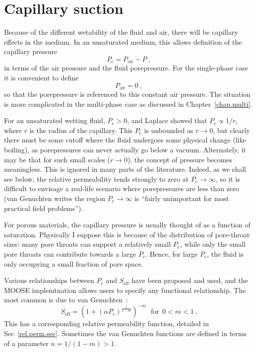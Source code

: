 \documentclass[]{scrreprt}
\begin{document}
\section{Capillary suction}

Because of the different wetability of the fluid and air, there will
be capillary effects in the medium.  In an unsaturated medium, this
allows definition of the capillary pressure
\begin{equation}
P_{\mathrm{c}} = P_{\mathrm{air}} - P \ ,
\end{equation}
in terms of the air pressure and the fluid porepressure.  For the
single-phase case it is convenient to define
\begin{equation}
P_{\mathrm{air}} = 0 \ ,
\label{eqn.pair.zero}
\end{equation}
so that the porepressure is referenced to this constant air pressure.
The situation is more complicated in the multi-phase case as discussed
in Chapter~\ref{chap.multi}.

For an unsaturated wetting fluid, $P_{\mathrm{c}} > 0$, and
Laplace showed that $P_{\mathrm{c}} \propto 1/r$, where $r$ is the
radius of the capillary.  This $P_{\mathrm{c}}$ is unbounded as
$r\rightarrow 0$, but clearly there must be some cutoff where the
fluid undergoes some physical change (like boiling), as porepressures
can never actually go below a vacuum.  Alternately, it may be that for
such small scales ($r\rightarrow 0$), the concept of pressure becomes
meaningless.  This is ignored in many parts of the literature.
Indeed, as we shall see below, the relative permeability tends
strongly to zero at $P_{\mathrm{c}} \rightarrow \infty$, so it is
difficult to envisage a real-life scenario where porepressures are
less than zero (van Genuchten writes the region
$P_{\mathrm{c}} \rightarrow \infty$ is ``fairly unimportant for most
practical field problems'').

For porous materials, the capillary pressure is usually thought of as
a function of saturation.  Physically I suppose this is because of the
distribution of pore-throat sizes: many pore throats can support a
relatively small $P_{\mathrm{c}}$, while only the small pore throats
can contribute towards a large $P_{\mathrm{c}}$.  Hence, for large
$P_{\mathrm{c}}$, the fluid is only occupying a small fraction of pore
space.

Various relationships between $P_{\mathrm{c}}$ and $S_{\mathrm{eff}}$
have been proposed and used, and the MOOSE implemtnation allows users
to specify any functional relationship.  The most common is due to van
Genuchten~\cite{vangenucthen1980}:
\begin{equation}
S_{\mathrm{eff}} = \left( 1 + (\alpha P_{c})^{\frac{1}{1 - m}}
\right)^{-m} \ \ \ \mbox{for}\ \ 0<m<1 \ .
\label{vg.cap.eqn}
\end{equation}
This has a corresponding relative permeability function, detailed in
Sec~\ref{rel.perm.sec}.  Sometimes the van Genuchten functions are
defined in terms of a parameter $n=1/(1-m)> 1$.
\end{document}
